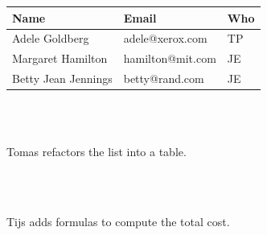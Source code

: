 \documentclass[english,crc]{programming}
\begin{document}
\begin{figure}
\begin{adjustwidth}{-2.5em}{-2.5em}
\begin{subfigure}[b]{22em}
{{   \begin{tabular}{| l | l | l |}
     \hline
     \textbf{Name} & \textbf{Email} & \textbf{Who} \\
     \hline \hline
     Adele Goldberg & adele@xerox.com & TP\\
     \hline
     Margaret Hamilton & hamilton@mit.com & JE\\
     \hline
     Betty Jean Jennings & betty@rand.com & JE\\
     \hline
   \end{tabular}
   \\~
   }}
   \caption{Tomas refactors the list into a table.}
   \label{fig:conf-tab}
\end{subfigure}
\\~\\
\begin{subfigure}[b]{18em}\vspace{0pt}
   \caption{Tijs adds formulas to compute the total cost.}
   \label{fig:conf-budget}
\end{subfigure}
\hfill
\begin{subfigure}[b]{22em}\vspace{0pt}
\end{subfigure}
\end{adjustwidth}
\end{figure}
\end{document}
